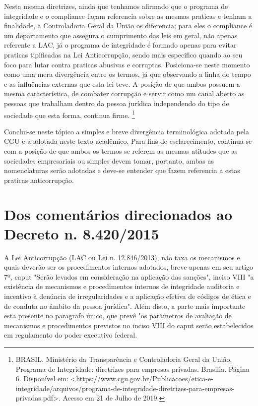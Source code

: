 Nesta mesma diretrizes, ainda que tenhamos afirmado que o programa de integridade e o compliance façam referencia sobre as mesmas praticas e tenham a finalidade, a Controladoria Geral da União os diferencia; para eles o compliance é um departamento que assegura o cumprimento das leis em geral, não apenas referente a LAC, já o programa de integridade é formado apenas para evitar praticas tipificadas na Lei Anticorrupção, sendo mais especifico quando ao seu foco para lutar contra praticas abusivas e corruptas. Posiciona-se neste momento como uma mera divergência entre os termos, já que observando a linha do tempo e as influências externas que esta lei teve. A posição de que ambos possuem a mesma característica, de combater corrupção e servir como um canal aberto as pessoas que trabalham dentro da pessoa jurídica independendo do tipo de sociedade que esta forma, continua firme. \footnote{BRASIL. Ministério da Transparência e Controladoria Geral da União. Programa de Integridade: diretrizes para empresas privadas. Brasilia. Página 6. Disponível em: <https://www.cgu.gov.br/Publicacoes/etica-e-integridade/arquivos/programa-de-integridade-diretrizes-para-empresas-privadas.pdf>. Acesso em 21 de Julho de 2019.}

 Conclui-se neste tópico a simples e breve divergência terminológica adotada pela CGU e a adotada neste texto acadêmico. Para fins de esclarecimento, continua-se com a posição de que ambos os termos se referem as mesmas atitudes que as sociedades empresariais ou simples devem tomar, portanto, ambas as nomenclaturas serão adotadas e deve-se entender que fazem referencia a estas praticas anticorrupção. 

\section{Dos comentários direcionados ao Decreto n. 8.420/2015}

 A Lei Anticorrupção (LAC ou Lei n. 12.846/2013), não taxa os mecanismos e quais deverão ser os procedimentos internos adotados, breve apenas em seu artigo 7º, caput "Serão levados em consideração na aplicação das sanções", inciso VIII "a existência de mecanismos e procedimentos internos de integridade auditoria e incentivo à denúncia de irregularidades e a aplicação efetiva de códigos de ética e de conduta no âmbito da pessoa jurídica". Além disto, a parte mais importante esta presente no paragrafo único, que prevê "os parâmetros de avaliação de mecanismos e procedimentos previstos no inciso VIII do caput serão estabelecidos em regulamento do poder executivo federal. 

